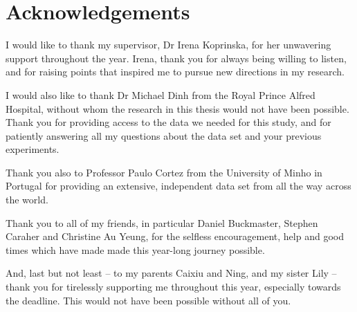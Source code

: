 \chapter*{Acknowledgements}

I would like to thank my supervisor, Dr Irena Koprinska, for her unwavering
support throughout the year. Irena, thank you for always being willing to
listen, and for raising points that inspired me to pursue new directions in
my research.

I would also like to thank Dr Michael Dinh from the Royal Prince Alfred
Hospital, without whom the research in this thesis would not have been
possible. Thank you for providing access to the data we needed for this study,
and for patiently answering all my questions about the data set and your
previous experiments.

Thank you also to Professor Paulo Cortez from the University of Minho in
Portugal for providing an extensive, independent data set from all the way
across the world.

Thank you to all of my friends, in particular Daniel Buckmaster, Stephen
Caraher and Christine Au Yeung, for the selfless encouragement, help and good
times which have made made this year-long journey possible.

And, last but not least -- to my parents Caixiu and Ning, and
my sister Lily -- thank you for tirelessly supporting me throughout this year,
especially towards the deadline. This would not have been possible without all
of you.
